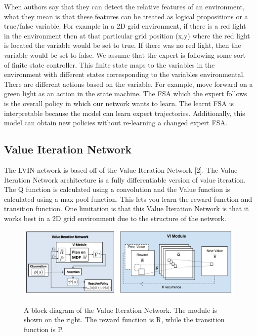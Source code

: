 \documentclass[letterpaper, 10 pt, conference]{ieeeconf}  %
\begin{document}
When authors say that they can detect the relative features of an environment, what they mean is that these features can be treated as logical propositions or a true/false variable. For example in a 2D grid environment, if there is a red light in the environment then at that particular grid position (x,y) where the red light is located the variable would be set to true. If there was no red light, then the variable would be set to false.
\newline
\indent We assume that the expert is following some sort of finite state controller. This finite state maps to the variables in the environment with different states corresponding to the variables environmental. There are different actions based on the variable. For example, move forward on a green light as an action in the state machine. The FSA which the expert follows is the overall policy in which our network wants to learn. The learnt FSA is interpretable because the model can learn expert trajectories. Additionally, this model can obtain new policies without re-learning a changed expert FSA.

\subsection{Value Iteration Network} 
The LVIN network is based off of the Value Iteration Network [2]. The Value Iteration Network architecture is a fully differentiable version of value iteration. The Q function is calculated using a convolution and the Value function is calculated using a max pool function. This lets you learn the reward function and transition function. One limitation is that this Value Iteration Network is that it works best in a 2D grid environment due to the structure of the network.
\begin{figure}[h]
 \centering
 \includegraphics[scale=.33]{ValueIterationNetwork.JPG}\\
 \caption{A block diagram of the Value Iteration Network. The module is shown on the right. The reward function is R, while the transition function is P.}
\end{figure}
\newpage
\end{document}
